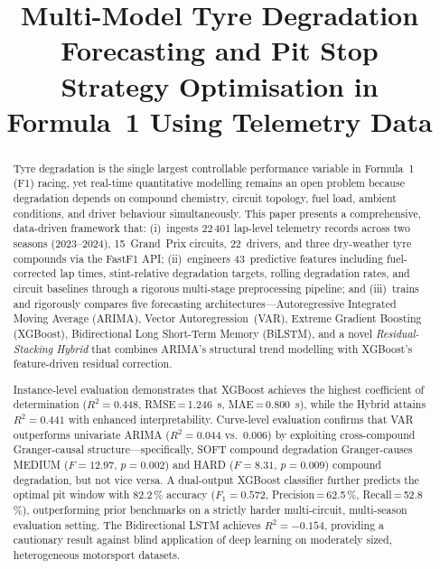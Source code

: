 \documentclass[journal,twoside]{IEEEtran}
\begin{document}
\title{Multi-Model Tyre Degradation Forecasting and Pit Stop \\
Strategy Optimisation in Formula~1 Using Telemetry Data}

\author{%
}

\maketitle

\begin{abstract}
Tyre degradation is the single largest controllable performance variable
in Formula~1 (F1) racing, yet real-time quantitative modelling remains
an open problem because degradation depends on compound chemistry,
circuit topology, fuel load, ambient conditions, and driver behaviour
simultaneously.  This paper presents a comprehensive, data-driven
framework that: (i)~ingests 22\,401 lap-level telemetry records across
two seasons (2023--2024), 15~Grand~Prix circuits, 22~drivers, and three
dry-weather tyre compounds via the FastF1 API; (ii)~engineers
43~predictive features including fuel-corrected lap times,
stint-relative degradation targets, rolling degradation rates, and
circuit baselines through a rigorous multi-stage preprocessing pipeline;
and (iii)~trains and rigorously compares five forecasting
architectures---Autoregressive Integrated Moving Average (ARIMA),
Vector Autoregression~(VAR), Extreme Gradient Boosting (XGBoost),
Bidirectional Long Short-Term Memory (BiLSTM), and a novel
\emph{Residual-Stacking Hybrid} that combines ARIMA's structural
trend modelling with XGBoost's feature-driven residual correction.

Instance-level evaluation demonstrates that XGBoost achieves the highest
coefficient of determination ($R^{2}=0.448$,
RMSE\,=\,\SI{1.246}{\second}, MAE\,=\,\SI{0.800}{\second}), while the
Hybrid attains $R^{2}=0.441$ with enhanced interpretability.
Curve-level evaluation confirms that VAR outperforms univariate ARIMA
($R^{2}=0.044$ vs.\ $0.006$) by exploiting cross-compound
Granger-causal structure---specifically, SOFT compound degradation
Granger-causes MEDIUM ($F=12.97$, $p=0.002$) and HARD ($F=8.31$,
$p=0.009$) compound degradation, but not vice versa.  A dual-output
XGBoost classifier further predicts the optimal pit window with
82.2\,\% accuracy ($F_{1}=0.572$, Precision\,=\,62.5\,\%,
Recall\,=\,52.8\,\%), outperforming prior benchmarks on a strictly
harder multi-circuit, multi-season evaluation setting.  The
Bidirectional LSTM achieves $R^{2}=-0.154$, providing a cautionary
result against blind application of deep learning on moderately sized,
heterogeneous motorsport datasets.


\end{abstract}
\end{document}
